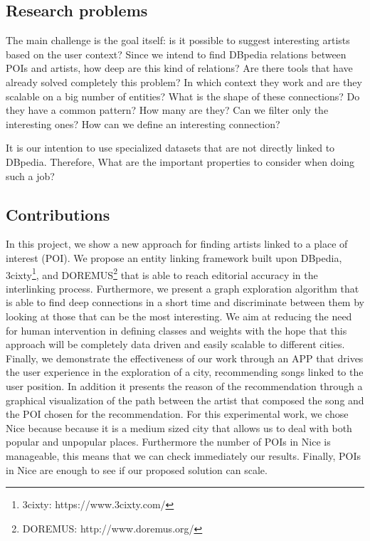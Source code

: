 \documentclass[paper=a4, fontsize=11pt]{scrartcl}
\begin{document}
\subsection{Research problems}
The main challenge is the goal itself: is it possible to suggest interesting artists based on the user context?
Since we intend to find DBpedia relations between POIs and artists, how deep are this kind of relations? Are there tools that have already solved completely this problem? In which context they work and are they scalable on a big number of entities? What is the shape of these connections? Do they have a common pattern? How many are they? Can we filter only the interesting ones? How can we define an interesting connection?

It is our intention to use specialized datasets that are not directly linked to DBpedia. Therefore, What are the important properties to consider when doing such a job?

\subsection{Contributions}
In this project, we show a new approach for finding artists linked to a place of interest (POI). We propose an entity linking framework built upon DBpedia, 3cixty\footnote{3cixty: https://www.3cixty.com/}, and DOREMUS\footnote{DOREMUS: http://www.doremus.org/} that is able to reach editorial accuracy in the interlinking process. Furthermore, we present a graph exploration algorithm that is able to find deep connections in a short time and discriminate between them by looking at those that can be the most interesting.
We aim at reducing the need for human intervention in defining classes and weights with the hope that this approach will be completely data driven and easily scalable to different cities.
Finally, we demonstrate the effectiveness of our work through an APP that drives the user experience in the exploration of a city, recommending songs linked to the user position. In addition it presents the reason of the recommendation through a graphical visualization of the path between the artist that composed the song and the POI chosen for the recommendation.
For this experimental work, we chose Nice because because it is a medium sized city that allows us to deal with both popular and unpopular places. Furthermore the number of POIs in Nice is manageable, this means that we can check immediately our results. Finally, POIs in Nice are enough to see if our proposed solution can scale.
\end{document}

